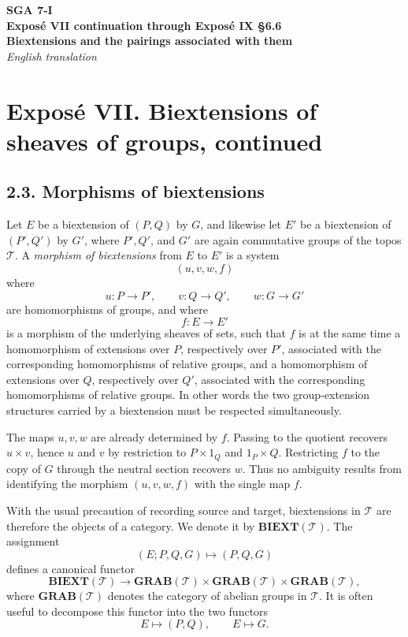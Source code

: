 \documentclass[11pt]{article}
\newcommand{\BIEXT}{\mathbf{BIEXT}}
\newcommand{\GRAB}{\mathbf{GRAB}}
\newcommand{\cT}{\mathcal T}
\begin{document}
\begin{center}
{\Large\textbf{SGA 7-I}}\\[0.35em]
{\large\textbf{Expos\'e VII continuation through Expos\'e IX \S{}6.6}}\\[0.25em]
{\large\textbf{Biextensions and the pairings associated with them}}\\[0.25em]
\textit{English translation}
\end{center}

\section*{Exposé VII. Biextensions of sheaves of groups, continued}

\subsection*{2.3. Morphisms of biextensions}

Let \(E\) be a biextension of \((P,Q)\) by \(G\), and likewise let \(E'\) be a
biextension of \((P',Q')\) by \(G'\), where \(P',Q'\), and \(G'\) are again
commutative groups of the topos \(\cT\). A \emph{morphism of biextensions}
from \(E\) to \(E'\) is a system
\[
(u,v,w,f)
\]
where
\[
u:P\longrightarrow P',\qquad v:Q\longrightarrow Q',
        \qquad w:G\longrightarrow G'
\]
are homomorphisms of groups, and where
\[
f:E\longrightarrow E'
\]
is a morphism of the underlying sheaves of sets, such that \(f\) is at the same
time a homomorphism of extensions over \(P\), respectively over \(P'\), associated
with the corresponding homomorphisms of relative groups, and a homomorphism of
extensions over \(Q\), respectively over \(Q'\), associated with the corresponding
homomorphisms of relative groups. In other words the two group-extension
structures carried by a biextension must be respected simultaneously.

The maps \(u,v,w\) are already determined by \(f\). Passing to the quotient
recovers \(u\times v\), hence \(u\) and \(v\) by restriction to
\(P\times 1_Q\) and \(1_P\times Q\). Restricting \(f\) to the copy of \(G\)
through the neutral section recovers \(w\). Thus no ambiguity results from
identifying the morphism \((u,v,w,f)\) with the single map \(f\).

With the usual precaution of recording source and target, biextensions in
\(\cT\) are therefore the objects of a category. We denote it by
\(\BIEXT(\cT)\). The assignment
\[
(E;P,Q,G)\longmapsto (P,Q,G)
\]
defines a canonical functor
\[
\BIEXT(\cT)\longrightarrow
\GRAB(\cT)\times\GRAB(\cT)\times\GRAB(\cT),
\]
where \(\GRAB(\cT)\) denotes the category of abelian groups in \(\cT\). It is
often useful to decompose this functor into the two functors
\[
E\longmapsto (P,Q),\qquad E\longmapsto G.
\]
\end{document}
